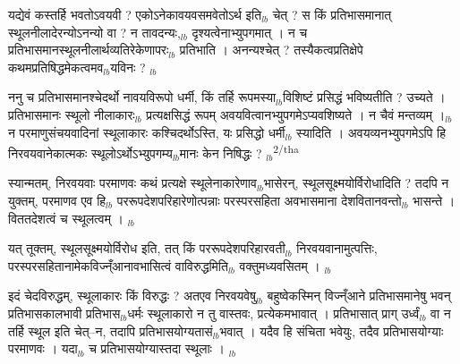 \documentclass[article,12pt,a4paper]{memoir}%
\newcounter{parCount}
\begin{document}
	  \pstart \leavevmode%
	यद्येवं कस्तर्हि भवतोऽवयवी ? एकोऽनेकावयवसमवेतोऽर्थ इति{\tiny $_{lb}$} चेत् ? स किं प्रतिभासमानात् स्थूलनीलादेरन्योऽनन्यो वा ? न तावदन्यः,{\tiny $_{lb}$} दृश्यत्वेनाभ्युपगमात् । न च प्रतिभासमानस्थूलनीलार्थव्यतिरेकेणापरः{\tiny $_{lb}$} प्रतिभाति । अनन्यश्चेत् ? तस्यैकत्वप्रतिक्षेपे कथमप्रतिषिद्धमेकत्वमव{\tiny $_{lb}$}यविनः ?
	{}
	\pend%
      {\tiny $_{lb}$}

	  \pstart \leavevmode%
	ननु च प्रतिभासमानश्चेदर्थो नावयविरूपो धर्मी, किं तर्हि रूपमस्या{\tiny $_{lb}$}विशिष्टं प्रसिद्धं भविष्यतीति ? उच्यते । प्रतिभासमानः स्थूलो नीलाकारः{\tiny $_{lb}$} प्रत्यक्षसिद्धं रूपम् अवयवित्वानभ्युपगमेऽप्यवशिष्यते । न चैवं मन्तव्यम् ।{\tiny $_{lb}$} न परमाणुसंचयवादिनां स्थूलाकारः कश्चिदर्थोऽस्ति, यः प्रसिद्धो धर्मी{\tiny $_{lb}$} स्यादिति । अवयव्यनभ्युपगमेऽपि हि निरवयवानेकात्मकः स्थूलोऽर्थोऽभ्युपगम्य{\tiny $_{lb}$}मानः केन निषिद्धः ?
	{}
	\pend%
      {\tiny $_{lb}$}\textsuperscript{\textenglish{2/tha}}

	  \pstart \leavevmode%
	स्यान्मतम्, निरवयवाः परमाणवः कथं प्रत्यक्षे स्थूलेनाकारेणाव{\tiny $_{lb}$}भासेरन्, स्थूलसूक्ष्मयोर्विरोधादिति ? तदपि न युक्तम्, परमाणव एव हि{\tiny $_{lb}$} पररूपदेशपरिहारेणोत्पन्नाः परस्परसहिता अवभासमाना देशवितानवन्तो{\tiny $_{lb}$} भासन्ते । विततदेशत्वं च स्थूलत्वम् ।
	{}
	\pend%
      {\tiny $_{lb}$}

	  \pstart \leavevmode%
	यत् तूक्तम्, स्थूलसूक्ष्मयोर्विरोध इति, तत् किं पररूपदेशपरिहारवती{\tiny $_{lb}$} निरवयवानामुत्पत्तिः, परस्परसहितानामेकविज्न्ँआनावभासित्वं वाविरुद्धमिति{\tiny $_{lb}$} वक्तुमध्यवसितम् ।
	{}
	\pend%
      {\tiny $_{lb}$}

	  \pstart \leavevmode%
	इदं चेदविरुद्धम्, स्थूलाकारः किं विरुद्धः ? अतएव निरवयवेषु{\tiny $_{lb}$} बहुष्वेकस्मिन् विज्न्ँआने प्रतिभासमानेषु भवन् प्रतिभासकालभावी प्रतिभास{\tiny $_{lb}$}धर्मः स्थूलाकारो न तु वास्तवः, प्रत्येकमभावात् । प्रतिभासात् प्राग् उर्ध्वं{\tiny $_{lb}$} वा न तर्हि स्थूल इति चेत्--न, तदापि प्रतिभासयोग्यतासं\leavevmode{}{\tiny $_{lb}$}भवात् । यदैव हि संचिता भवेयुः, तदैव प्रतिभासयोग्याः परमाणवः । यदा{\tiny $_{lb}$} च प्रतिभासयोग्यास्तदा स्थूलाः ।
	{}
	\pend%
      {\tiny $_{lb}$}
\end{document}
